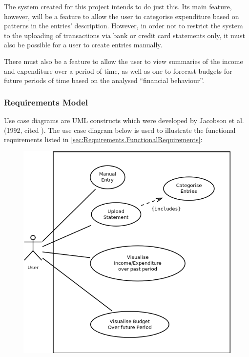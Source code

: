 The system created for this project intends to do just this. Its main feature,
however, will be a feature to allow the user to categorise expenditure based on
patterns in the entries' description. However, in order not to restrict the
system to the uploading of transactions via bank or credit card statements
only, it must also be possible for a user to create entries manually.

There must also be a feature to allow the user to view summaries of the income
and expenditure over a period of time, as well as one to forecast budgets for
future periods of time based on the analysed ``financial behaviour''.

\subsubsection{Requirements Model} \label{sec:Requirements.RequirementsModel}

Use case diagrams are UML constructs which were developed by Jacobson et al.
(1992, cited \cite[][p.~154]{bennett2010object}). The use case diagram below is
used to illustrate the functional requirements listed in
\ref{sec:Requirements.FunctionalRequirements}:

\begin{figure}[ht!]
  \begin{center}
    \includegraphics[width=14cm]{./contents/img/Use_Case_Diagram.png}
  \end{center}
\end{figure}
\FloatBarrier

